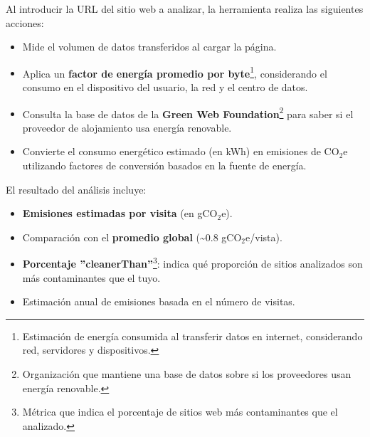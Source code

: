\documentclass[12pt,a4paper]{report}
\begin{document}
Al introducir la URL del sitio web a analizar, la herramienta realiza las
siguientes acciones:

\begin{itemize}
  \item Mide el volumen de datos transferidos al cargar la página.
  \item Aplica un \textbf{factor de energía promedio por byte}\footnote{Estimación de
          energía consumida al transferir datos en internet, considerando red, servidores
          y dispositivos.}, considerando el consumo en el dispositivo del usuario, la red
        y el centro de datos.
  \item Consulta la base de datos de la \textbf{Green Web
          Foundation}\footnote{Organización que mantiene una base de datos sobre si los
          proveedores usan energía renovable.} para saber si el proveedor de alojamiento
        usa energía renovable.
  \item Convierte el consumo energético estimado (en kWh) en emisiones de CO$_2$e
        utilizando factores de conversión basados en la fuente de energía.
\end{itemize}

El resultado del análisis incluye:

\begin{itemize}
  \item \textbf{Emisiones estimadas por visita} (en gCO$_2$e).
  \item Comparación con el \textbf{promedio global} (\textasciitilde0.8
        gCO$_2$e/vista).
  \item \textbf{Porcentaje ''cleanerThan''}\footnote{Métrica que indica el porcentaje de sitios web más contaminantes que el analizado.}: indica qué proporción de sitios analizados son más contaminantes que el tuyo.
  \item Estimación anual de emisiones basada en el número de visitas.
\end{itemize}
\end{document}
